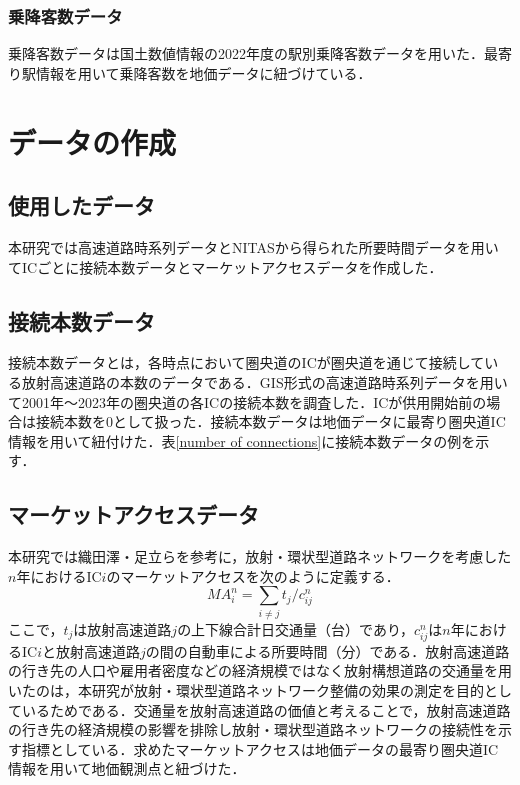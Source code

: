 \subsubsection{乗降客数データ}
乗降客数データは国土数値情報の2022年度の駅別乗降客数データを用いた．最寄り駅情報を用いて乗降客数を地価データに紐づけている．
\newpage
\section{データの作成}
\subsection{使用したデータ}
本研究では高速道路時系列データとNITASから得られた所要時間データを用いてICごとに接続本数データとマーケットアクセスデータを作成した．

\subsection{接続本数データ}
接続本数データとは，各時点において圏央道のICが圏央道を通じて接続している放射高速道路の本数のデータである．GIS形式の高速道路時系列データを用いて2001年〜2023年の圏央道の各ICの接続本数を調査した．ICが供用開始前の場合は接続本数を0として扱った．接続本数データは地価データに最寄り圏央道IC情報を用いて紐付けた．表\ref{number of connections}に接続本数データの例を示す．



\subsection{マーケットアクセスデータ}
本研究では織田澤・足立らを参考に，放射・環状型道路ネットワークを考慮した$n$年におけるIC$i$のマーケットアクセスを次のように定義する．
\[{MA}^{n}_{i} = \sum_{i \neq j}{t_{j}/c^{n}_{ij}}\]
ここで，$t_{j}$は放射高速道路$j$の上下線合計日交通量（台）であり，$c^{n}_{ij}$は$n$年におけるIC$i$と放射高速道路$j$の間の自動車による所要時間（分）である．放射高速道路の行き先の人口や雇用者密度などの経済規模ではなく放射構想道路の交通量を用いたのは，本研究が放射・環状型道路ネットワーク整備の効果の測定を目的としているためである．交通量を放射高速道路の価値と考えることで，放射高速道路の行き先の経済規模の影響を排除し放射・環状型道路ネットワークの接続性を示す指標としている．求めたマーケットアクセスは地価データの最寄り圏央道IC情報を用いて地価観測点と紐づけた．

